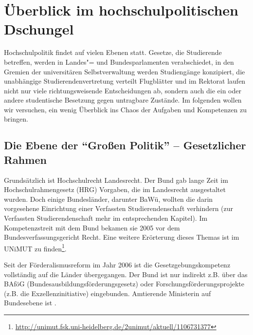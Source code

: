 \section{Überblick im hochschulpolitischen Dschungel}
\label{hopo}

Hochschulpolitik findet auf vielen Ebenen statt. Gesetze, die Studierende betreffen, werden in Landes"= und Bundesparlamenten verabschiedet, in den Gremien der universitären Selbstverwaltung werden Studiengänge konzipiert, die unabhängige Studierendenvertretung verteilt Flugblätter und im Rektorat laufen nicht nur viele richtungsweisende Entscheidungen ab, sondern auch die ein oder andere studentische Besetzung gegen untragbare Zustände.
Im folgenden wollen wir versuchen, ein wenig Überblick ins Chaos der Aufgaben und Kompetenzen zu bringen.

\subsection{Die Ebene der "`Großen Politik"' -- Gesetzlicher Rahmen}
Grundsätzlich ist Hochschulrecht Landesrecht. Der Bund gab lange Zeit im Hochschulrahmengesetz (HRG) Vorgaben, die im Landesrecht ausgestaltet
wurden. Doch einige Bundesländer, darunter BaWü, wollten die darin vorgesehene Einrichtung einer Verfassten Studierendenschaft verhindern (zur Verfassten Studierendenschaft mehr im entsprechenden Kapitel). Im Kompetenzstreit mit dem Bund bekamen sie 2005 vor dem Bundesverfassungsgericht Recht. Eine weitere Erörterung dieses Themas ist im UNiMUT zu finden\footnote{\url{http://unimut.fsk.uni-heidelberg.de/2unimut/aktuell/1106731377}}.

Seit der Förderalismusreform im Jahr 2006 ist die Gesetzgebungskompetenz vollständig auf die Länder übergegangen. Der Bund ist nur indirekt z.B. über das BAföG (Bundesausbildungsförderungsgesetz) oder Forschungsförderungsprojekte (z.B. die Exzellenzinitiative) eingebunden. Amtierende Ministerin auf Bundesebene ist \wissenschaftsministerbund .

